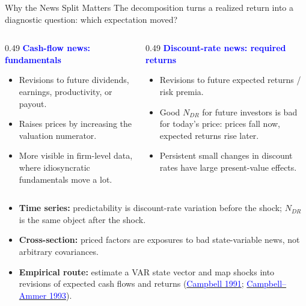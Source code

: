 \documentclass{beamer}
\begin{document}
\begin{frame}{Why the News Split Matters}
\footnotesize
\RaggedRight
The decomposition turns a realized return into a diagnostic question: \alert{which expectation moved?}
\begin{columns}[T,onlytextwidth]
\begin{column}{0.49\textwidth}
\textbf{\textcolor{blue}{Cash-flow news: fundamentals}}
\begin{itemize}\scriptsize\itemsep1pt
  \item Revisions to future dividends, earnings, productivity, or payout.
  \item Raises prices by increasing the valuation numerator.
  \item More visible in firm-level data, where idiosyncratic fundamentals move a lot.
\end{itemize}
\end{column}
\begin{column}{0.49\textwidth}
\textbf{\textcolor{blue}{Discount-rate news: required returns}}
\begin{itemize}\scriptsize\itemsep1pt
  \item Revisions to future expected returns / risk premia.
  \item Good $N_{DR}$ for future investors is bad for today's price: prices fall now, expected returns rise later.
  \item Persistent small changes in discount rates have large present-value effects.
\end{itemize}
\end{column}
\end{columns}

\vspace{-0.2em}
\begin{itemize}\scriptsize\itemsep2pt
  \item \textbf{Time series:} predictability is discount-rate variation before the shock; $N_{DR}$ is the same object after the shock.
  \item \textbf{Cross-section:} priced factors are exposures to bad state-variable news, not arbitrary covariances.
  \item \textbf{Empirical route:} estimate a VAR state vector and map shocks into revisions of expected cash flows and returns (\href{https://doi.org/10.2307/2233809}{\textcolor{blue}{Campbell 1991}}; \href{https://doi.org/10.1111/j.1540-6261.1993.tb04700.x}{\textcolor{blue}{Campbell--Ammer 1993}}).
\end{itemize}
\end{frame}
\end{document}
